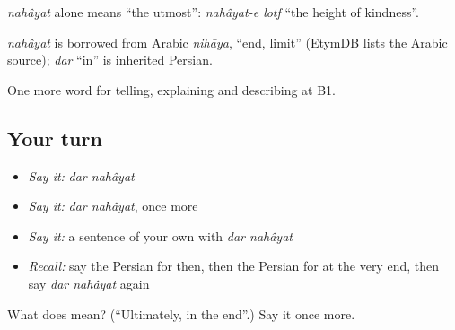 \emph{nahâyat} alone means \textquotedblleft{}the utmost\textquotedblright{}: \emph{nahâyat-e lotf} \textquotedblleft{}the height of kindness\textquotedblright{}.

\begin{cousinweb}
\emph{nahâyat} is borrowed from Arabic \emph{nihāya}, \textquotedblleft{}end, limit\textquotedblright{} (EtymDB lists the Arabic source); \emph{dar} \textquotedblleft{}in\textquotedblright{} is inherited Persian.
\end{cousinweb}

\begin{grammarlens}[title={What you've built}]
One more word for telling, explaining and describing at B1.
\end{grammarlens}

\subsection*{Your turn}
\begin{itemize}
\raggedright
  \item \emph{Say it:} \emph{dar nahâyat}
  \item \emph{Say it:} \emph{dar nahâyat}, once more
  \item \emph{Say it:} a sentence of your own with \emph{dar nahâyat}
  \item \emph{Recall:} say the Persian for then, then the Persian for at the very end, then say \emph{dar nahâyat} again
\end{itemize}

\begin{tcolorbox}[breakable,colback=teal!4,colframe=teal!35!black,title={Before you move on}]
What does   mean? (\textquotedblleft{}Ultimately, in the end\textquotedblright{}.) Say it once more.
\end{tcolorbox}
